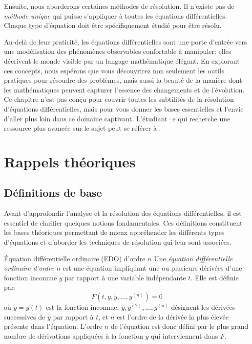        Ensuite, nous aborderons certaines méthodes de résolution. Il n’existe pas de \textit{méthode unique} qui puisse s'appliquer à toutes les équations différentielles. Chaque type d'équation doit être spécifiquement étudié pour être résolu.
        
        Au-delà de leur praticité, les équations différentielles sont une porte d'entrée vers une modélisation des phénomènes observables confortable à manipuler: elles décrivent le monde visible par un langage mathématique élégant. En explorant ces concepts, nous espérons que vous découvrirez non seulement les outils pratiques pour résoudre des problèmes, mais aussi la beauté de la manière dont les mathématiques peuvent capturer l’essence des changements et de l’évolution. Ce chapitre n'est pas conçu pour couvrir toutes les subtilités de la résolution d'équations différentielles, mais pour vous donner les bases essentielles et l'envie d'aller plus loin dans ce domaine captivant. L'étudiant·e qui recherche une ressource plus avancée sur le sujet peut se référer à \cite{Bangerezako2006}.

    \section{Rappels théoriques}
        \subsection{Définitions de base}
        Avant d'approfondir l'analyse et la résolution des équations différentielles, il est essentiel de clarifier quelques notions fondamentales. Ces définitions constituent les bases théoriques permettant de mieux appréhender les différents types d'équations et d'aborder les techniques de résolution qui leur sont associées. 
        
        \begin{definition}{Équation différentielle ordinaire (EDO) d'ordre $n$}\label{def:eqdiff}
            Une \textit{équation différentielle ordinaire d'ordre $n$} est une équation impliquant une ou plusieurs dérivées d'une fonction inconnue $y$ par rapport à une variable indépendante $t$. Elle est définie par:
            \begin{equation}
                F(t, y, \dot{y}, \ldots, y^{(n)})=0
            \end{equation}
            où $y=y(t)$ est la fonction inconnue, $\dot{y}, y^{(2)}, \ldots, y^{(n)}$ désignent les dérivées successives de $y$ par rapport à $t$, et $n$ est l'ordre de la dérivée la plus élevée présente dans l'équation. L'ordre $n$ de l'équation est donc défini par le plus grand nombre de dérivations appliquées à la fonction $y$ qui interviennent dans $F$.
        \end{definition}
        
